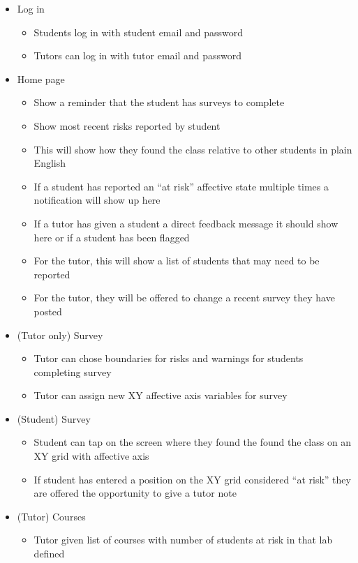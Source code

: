 \documentclass{l4proj}
\begin{document}
\begin{itemize}
    \item Log in
    \begin{itemize}
        \item Students log in with student email and password
        \item Tutors can log in with tutor email and password
    \end{itemize}
    \item Home page
    \begin{itemize}
        \item Show a reminder that the student has surveys to complete
        \item Show most recent risks reported by student
        \item This will show how they found the class relative to other students in plain English
        \item If a student has reported an “at risk” affective state multiple times a notification will show up here
        \item If a tutor has given a student a direct feedback message it should show here or if a student has been flagged
        \item For the tutor, this will show a list of students that may need to be reported
        \item For the tutor, they will be offered to change a recent survey they have posted
    \end{itemize}
    \item (Tutor only) Survey
\begin{itemize}
    \item Tutor can chose boundaries for risks and warnings for students completing survey
    \item Tutor can assign new XY affective axis variables for survey
\end{itemize}
\item (Student) Survey
\begin{itemize}
    \item Student can tap on the screen where they found the found the class on an XY grid with affective axis
    \item If student has entered a position on the XY grid considered “at risk” they are offered the opportunity to give a tutor note
\end{itemize}
\item (Tutor) Courses
\begin{itemize}
    \item Tutor given list of courses with number of students at risk in that lab defined

\end{itemize}
\end{itemize}
\end{document}
